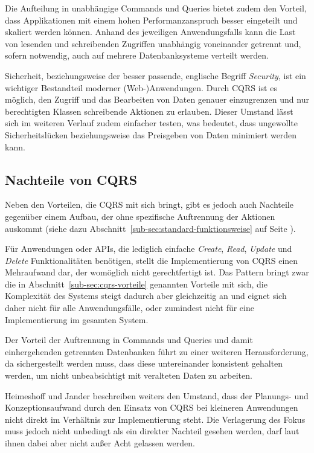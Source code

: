 \documentclass[a4paper,12pt,twoside]{scrreprt}
\begin{document}
Die Aufteilung in unabhängige Commands und Queries bietet zudem den Vorteil, dass Applikationen mit einem hohen Performanzanspruch besser eingeteilt und skaliert werden können. Anhand des jeweiligen Anwendungsfalls kann die Last von lesenden und schreibenden Zugriffen unabhängig voneinander getrennt und, sofern notwendig, auch auf mehrere Datenbanksysteme verteilt werden. \parencite[][]{fowler_cqrs_2011}

Sicherheit, beziehungsweise der besser passende, englische Begriff \textit{Security}, ist ein wichtiger Bestandteil moderner (Web-)Anwendungen. Durch CQRS ist es möglich, den Zugriff und das Bearbeiten von Daten genauer einzugrenzen und nur berechtigten Klassen schreibende Aktionen zu erlauben. Dieser Umstand lässt sich im weiteren Verlauf zudem einfacher testen, was bedeutet, dass ungewollte Sicherheitslücken beziehungsweise das Preisgeben von Daten minimiert werden kann. \parencite[][Seite 240]{ingeno_software_2018}

\subsection{Nachteile von CQRS}
\label{sub-sec:nachteile-cqrs}
Neben den Vorteilen, die CQRS mit sich bringt, gibt es jedoch auch Nachteile gegenüber einem Aufbau, der ohne spezifische Auftrennung der Aktionen auskommt (siehe dazu Abschnitt~\ref{sub-sec:standard-funktionsweise} auf Seite \pageref{sub-sec:standard-funktionsweise}).

Für Anwendungen oder APIs, die lediglich einfache \textit{Create}, \textit{Read}, \textit{Update} und \textit{Delete} Funktionalitäten benötigen, stellt die Implementierung von CQRS einen Mehraufwand dar, der womöglich nicht gerechtfertigt ist. Das Pattern bringt zwar die in Abschnitt~\ref{sub-sec:cqrs-vorteile} genannten Vorteile mit sich, die Komplexität des Systems steigt dadurch aber gleichzeitig an und eignet sich daher nicht für alle Anwendungsfälle, oder zumindest nicht für eine Implementierung im gesamten System. \parencite[][Seite 241]{ingeno_software_2018}

Der Vorteil der Auftrennung in Commands und Queries und damit einhergehenden getrennten Datenbanken führt zu einer weiteren Herausforderung, da sichergestellt werden muss, dass diese untereinander konsistent gehalten werden, um nicht unbeabsichtigt mit veralteten Daten zu arbeiten. \parencite[][Seite 241]{ingeno_software_2018}

Heimeshoff und Jander beschreiben weiters den Umstand, dass der Planungs- und Konzeptionsaufwand durch den Einsatz von CQRS bei kleineren Anwendungen nicht direkt im Verhältnis zur Implementierung steht. Die Verlagerung des Fokus muss jedoch nicht unbedingt als ein direkter Nachteil gesehen werden, darf laut ihnen dabei aber nicht außer Acht gelassen werden. \parencite[][]{heimeshoff_cqrs_2013}
\end{document}

